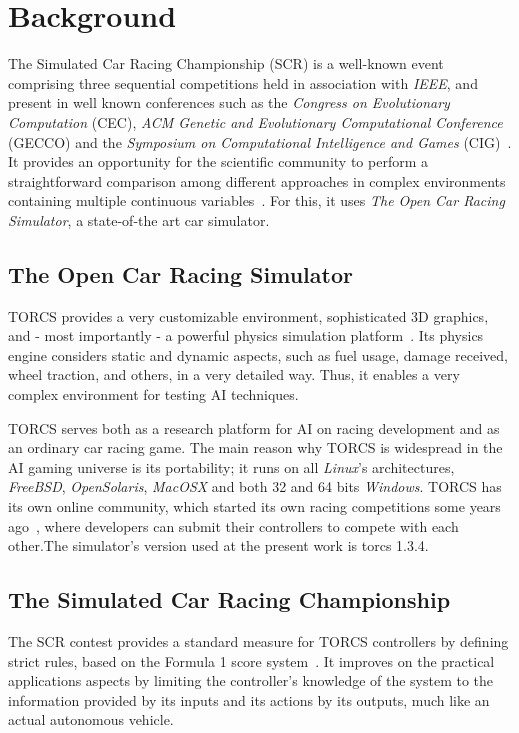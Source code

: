 \section{Background}\label{sec:background}

The Simulated Car Racing Championship (SCR) is a well-known event comprising 
three sequential competitions held in association with \textit{IEEE}, and 
present in well known conferences such as the \textit{Congress on Evolutionary 
Computation} (CEC), \textit{ACM Genetic and Evolutionary Computational Conference} 
(GECCO) and the \textit{Symposium on Computational Intelligence and Games} 
(CIG)~\cite{scr2009}.  It provides an opportunity for the scientific community 
to perform a straightforward comparison among different approaches in complex 
environments containing multiple continuous variables~\cite{caldeira_2013}. For 
this, it uses \emph{The Open Car Racing Simulator}, a state-of-the art car simulator. 

\subsection{The Open Car Racing Simulator}
TORCS provides a very customizable environment, sophisticated 3D graphics, and -
most importantly - a powerful physics simulation platform~\cite{manual}. Its 
physics engine considers static and dynamic aspects, such as fuel usage, damage 
received, wheel traction, and others, in a very detailed way. Thus, it enables 
a very complex environment for testing AI techniques.

TORCS serves both as a research platform for AI on racing development and as an 
ordinary car racing game. The main reason why TORCS is widespread in the AI gaming 
universe is its portability; it runs on all \textit{Linux}'s architectures,
\textit{FreeBSD}, \textit{OpenSolaris}, \textit{MacOSX} and both 32 and 64 bits 
\textit{Windows}. TORCS has its own online community, which started its own 
racing competitions some years ago~\cite{TORCS}, where developers can submit 
their controllers to compete with each other.The simulator's version used at the present work is torcs 1.3.4.

\subsection{The Simulated Car Racing Championship}
The SCR contest provides a standard measure for TORCS controllers by defining strict
rules, based on the Formula 1 score system~\cite{scr2009}. It improves on the 
practical applications aspects by limiting the controller's knowledge of 
the system to the information provided by its inputs and its actions by its outputs,
much like an actual autonomous vehicle.

